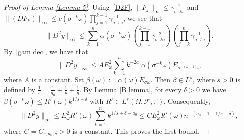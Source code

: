 \documentclass[11pt,reqno,a4paper]{article}
\theoremstyle{special}
\def\om{\omega}
\begin{document}
\begin{proof}[Proof of Lemma \ref{Lemma 5}]
Using~\eqref{D2F}, $\|F_j\|_\infty \le \gamma_{\sigma^{-j}  \om}^{-1}$ and $\|(DF_k)\|_\infty \le c(\sigma^{-k} \om)\prod_{j=1}^{k-1} \gamma_{\sigma^{-j} \om}^{-1}$,
we see that
 $$
\|D^2y\|_\infty\leq \sum_{k=1}^n\alpha(\sigma^{-k}\omega)\left(\prod_{j=1}^{k-1}\gamma_{\sigma^{-j}\omega}^{-2}\right)\left(\prod_{j=k}^{n}\gamma_{\sigma^{-j}\omega}^{-1}\right).
 $$
 By~\eqref{gam dec}, we have that 
 $$
\|D^2y\|_\infty\leq AE_\omega^2\sum_{k=1}^n k^{-2a_0}\alpha(\sigma^{-k}\omega)E_{\sigma^{-(k-1)}\omega}
 $$
 where $A$ is a constant.
Set $\beta(\omega):=\alpha(\omega)E_{\sigma\omega}$. Then $\beta\in L^{s}$, where $s>0$ is defined by $\frac1s=\frac{1}{q_0}+\frac{1}{p}+\frac{1}{q}$.
By Lemma \ref{B lemma}, for every $\delta>0$ we have $\beta(\sigma^{-k}\omega)\leq R'(\omega)k^{1/s+\delta}$ with $R'\in L^s(\Omega,\mathcal F,\mathbb P)$. Consequently,
$$
\|D^2y\|_\infty\leq E_\omega^2 R'(\omega)\sum_{k=1}^n k^{1/s+\delta-a_0}\leq CE_\omega^2 R'(\omega) n^{-(a_0-1-1/s-\delta)},
$$
where $C=C_{s,a_0,\delta}>0$ is a constant. This proves the first bound. 


\end{proof}
\end{document}
